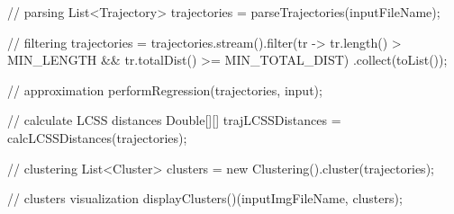 // parsing
List<Trajectory> trajectories = parseTrajectories(inputFileName);

// filtering
trajectories = trajectories.stream().filter(tr -> 
		tr.length() > MIN_LENGTH && tr.totalDist() >= MIN_TOTAL_DIST)
	.collect(toList());

// approximation
performRegression(trajectories, input);

// calculate LCSS distances
Double[][] trajLCSSDistances = calcLCSSDistances(trajectories);

// clustering
List<Cluster> clusters = new Clustering().cluster(trajectories);

// clusters visualization
displayClusters()(inputImgFileName, clusters);